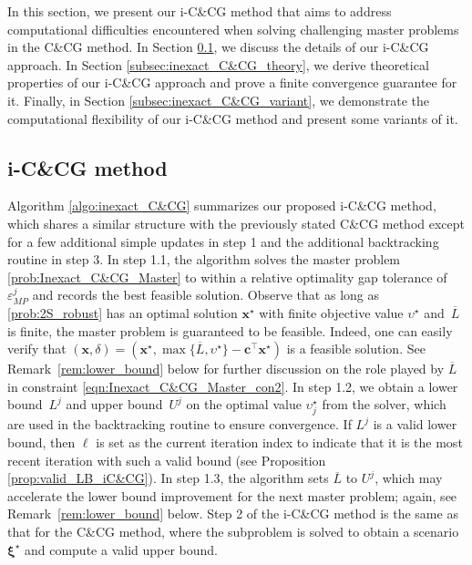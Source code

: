 \documentclass[preprint,review,11pt]{elsarticle}
\theoremstyle{definition}
\theoremstyle{remark}
\newcommand{\tp}{\top}
\newcommand{\xb}{\pmb{x}}
\newcommand{\cb}{\pmb{c}}
\newcommand{\xib}{\pmb{\xi}}
\newcommand{\Lbar}{\overline{L}}
\begin{document}
In this section, we present our i-C\&CG method that aims to address computational difficulties encountered when solving challenging master problems in the C\&CG method. In Section \ref{subsec:inexact_C&CG_algo}, we discuss the details of our i-C\&CG approach. In Section \ref{subsec:inexact_C&CG_theory}, we derive theoretical properties of our i-C\&CG approach and prove a finite convergence guarantee for it. Finally, in Section \ref{subsec:inexact_C&CG_variant}, we demonstrate the computational flexibility of our i-C\&CG method and present some variants of it.

\subsection{i-C\&CG method}  \label{subsec:inexact_C&CG_algo}

Algorithm \ref{algo:inexact_C&CG} summarizes our proposed i-C\&CG method, which shares a similar structure with the previously stated C\&CG method except for a few additional simple updates in step 1 and the additional backtracking routine in step 3.  In step 1.1, the algorithm solves the master problem \eqref{prob:Inexact_C&CG_Master} to within a relative optimality gap tolerance of $\varepsilon_{MP}^j$ and records the best feasible solution. Observe that as long as \eqref{prob:2S_robust} has an optimal solution $\xb^\star$ with finite objective value $\upsilon^\star$ and~$\Lbar$ is finite, the master problem is guaranteed to be feasible. Indeed, one can easily verify that $(\xb,\delta)=(\xb^\star,\max\{\Lbar,\upsilon^\star\}-\cb^\tp\xb^\star)$ is a feasible solution. See Remark~\ref{rem:lower_bound} below for further discussion on the role played by $\Lbar$ in constraint \eqref{eqn:Inexact_C&CG_Master_con2}.  In step 1.2, we obtain a lower bound~$L^j$ and upper bound~$U^j$ on the optimal value $\upsilon^\star_j$ from the solver, which are used in the backtracking routine to ensure convergence.  If $L^j$ is a valid lower bound, then $\ell$ is set as the current iteration index to indicate that it is the most recent iteration with such a valid bound (see Proposition \ref{prop:valid_LB_iC&CG}). In step 1.3, the algorithm sets $\Lbar$ to $U^j$, which may accelerate the lower bound improvement for the next master problem; again, see Remark~\ref{rem:lower_bound} below.  Step 2 of the i-C\&CG method is the same as that for the C\&CG method, where the subproblem is solved to obtain a scenario $\xib^\star$ and compute a valid upper bound.
\end{document}
